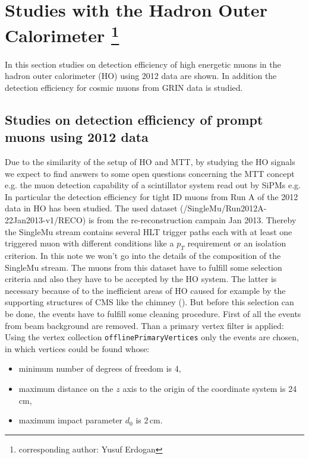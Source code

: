 \section[Studies with the Hadron Outer Calorimeter]{Studies with the Hadron Outer Calorimeter \footnote{corresponding author: Yusuf Erdogan}}
\label{sec:HOstudies}
	In this section studies on detection efficiency of high energetic muons in the hadron outer calorimeter (HO) using 2012 data are shown.
	In addition the detection efficiency for cosmic muons from GRIN data is studied.
	\subsection{Studies on detection efficiency of prompt muons using 2012 data}
		Due to the similarity of the setup of HO and MTT, by studying the HO signals we expect to find answers to some open questions concerning the MTT concept e.g. the muon detection capability of a
		scintillator system read out by SiPMs e.g.
		In particular the detection efficiency for tight ID muons from Run A of the 2012 data in HO has been studied.
		The used dataset (/SingleMu/Run2012A-22Jan2013-v1/RECO) is from the re-reconstruction campain Jan 2013.
		Thereby the SingleMu stream contains several HLT trigger paths each with at least one triggered muon with different conditions like a $p_T$ requirement or an isolation criterion.
		In this note we won't go into the details of the composition of the SingleMu stream. 
		The muons from this dataset have to fulfill some selection criteria and also they have to be accepted by the HO system.
		The latter is necessary because of to the inefficient areas of HO caused for example by the supporting structures of CMS like the chimney (\cite{JINST}).
		But before this selection can be done, the events have to fulfill some cleaning procedure.
		First of all the events from beam background are removed.
		Than a primary vertex filter is applied:
		Using the vertex collection \verb+offlinePrimaryVertices+ only the events are chosen, in which vertices could be found whose:
			\begin{itemize}
				\item minimum number of degrees of freedom is 4,
				\item maximum distance on the $z$ axis to the origin of the coordinate system is 24\,cm,
				\item maximum impact parameter $d_0$ is 2\,cm.
			\end{itemize}
